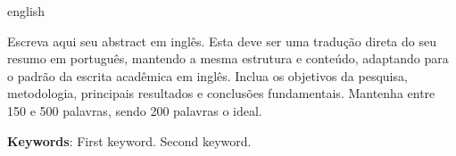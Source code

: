 \begin{resumo}[Abstract]
 \begin{otherlanguage*}{english}

  Escreva aqui seu abstract em inglês. Esta deve ser uma tradução direta do seu resumo em português, mantendo a mesma estrutura e conteúdo, adaptando para o padrão da escrita acadêmica em inglês. Inclua os objetivos da pesquisa, metodologia, principais resultados e conclusões fundamentais. Mantenha entre 150 e 500 palavras, sendo 200 palavras o ideal.

   \vspace{\onelineskip}
 
   \noindent 
   \textbf{Keywords}: First keyword. Second keyword.

 \end{otherlanguage*}
\end{resumo}
